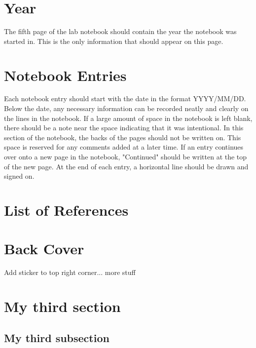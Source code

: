 \documentclass[11pt, oneside]{article}   	%
\begin{document}
\section{Year}

The fifth page of the lab notebook should contain the year the notebook was started in. This is the only information that should appear on this page.

\section{Notebook Entries}

Each notebook entry should start with the date in the format YYYY/MM/DD. Below the date, any necessary information can be recorded neatly and clearly on the lines in the notebook. If a large amount of space in the notebook is left blank, there should be a note near the space indicating that it was intentional. In this section of the notebook, the backs of the pages should not be written on. This space is reserved for any comments added at a later time. If an entry continues over onto a new page in the notebook, "Continued" should be written at the top of the new page. At the end of each entry, a horizontal line should be drawn and signed on. 

\section{List of References}
\section{Back Cover}	
Add sticker to top right corner...	
more stuff		%



\section{My third section}				%
\subsection{My third subsection}		%





\newpage							%

\end{document}

